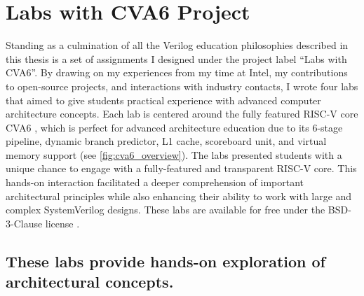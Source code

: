 
\chapter{Labs with CVA6 Project}
\label{chapter:labs_with_cva6}



Standing as a culmination of all the Verilog education philosophies described in this thesis is a set of assignments I designed under the project label \enquote{Labs with CVA6}. By drawing on my experiences from my time at Intel, my contributions to open-source projects, and interactions with industry contacts, I wrote four labs that aimed to give students practical experience with advanced computer architecture concepts. Each lab is centered around the fully featured RISC-V core CVA6 \cite{cva6}, which is perfect for advanced architecture education due to its 6-stage pipeline, dynamic branch predictor, L1 cache, scoreboard unit, and virtual memory support (see \autoref{fig:cva6_overview}). The labs presented students with a unique chance to engage with a fully-featured and transparent RISC-V core. This hands-on interaction facilitated a deeper comprehension of important architectural principles while also enhancing their ability to work with large and complex SystemVerilog designs. These labs are available for free under the BSD-3-Clause license \cite{labsWithCVA6}.

\FloatBarrier

\section{These labs provide hands-on exploration of architectural concepts.}






